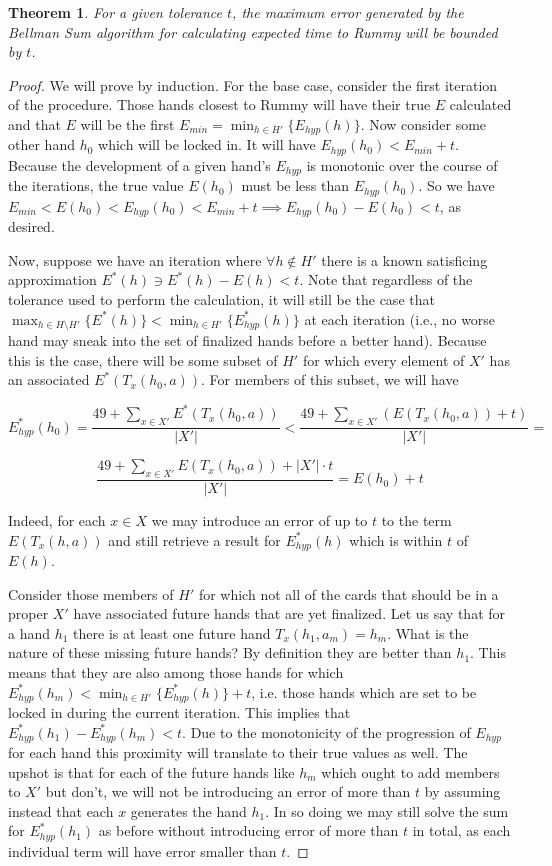 \documentclass[paper=a4, fontsize=11pt,twoside]{report}   %
\newtheorem{theorem}{Theorem}
\begin{document}
\begin{theorem}
For a given tolerance $t$, the maximum error generated by the Bellman Sum algorithm for calculating expected time to Rummy will be bounded by $t$.
\end{theorem}

\begin{proof}
We will prove by induction. For the base case, consider the first iteration of the procedure. Those hands closest to Rummy will have their true $E$ calculated and that $E$ will be the first $E_{min} = \min_{h \in H'} \{E_{hyp}(h)\}$. Now consider some other hand $h_0$ which will be locked in. It will have $E_{hyp}(h_0) < E_{min} + t$. Because the development of a given hand's $E_{hyp}$ is monotonic over the course of the iterations, the true value $E(h_0)$ must be less than $E_{hyp}(h_0)$. So we have $E_{min} < E(h_0) < E_{hyp}(h_0) < E_{min} + t \implies E_{hyp}(h_0) - E(h_0) < t$, as desired.

Now, suppose we have an iteration where $\forall h \notin H'$ there is a known satisficing approximation $E^*(h) \ni E^*(h) - E(h) < t$. Note that regardless of the tolerance used to perform the calculation, it will still be the case that $\max_{h \in H\setminus H'}\{E^*(h)\} < \min_{h \in H'}\{E_{hyp}^*(h)\}$ at each iteration (i.e., no worse hand may sneak into the set of finalized hands before a better hand). Because this is the case, there will be some subset of $H'$ for which every element of $X'$ has an associated $E^*(T_x(h_0,a))$. For members of this subset, we will have

$$E_{hyp}^*(h_0) = \frac{49+\sum_{x\in X'} E^*(T_x(h_0,a))}{|X'|} <  \frac{49+\sum_{x\in X'} (E(T_x(h_0,a))+t)}{|X'|} = $$

$$\frac{49+\sum_{x\in X'} E(T_x(h_0,a))+|X'| \cdot t}{|X'|} = E(h_0) + t$$

Indeed, for each $x \in X$ we may introduce an error of up to $t$ to the term $E(T_x(h,a))$ and still retrieve a result for $E_{hyp}^*(h)$ which is within $t$ of $E(h)$.

Consider those members of $H'$ for which not all of the cards that should be in a proper $X'$ have associated future hands that are yet finalized. Let us say that for a hand $h_1$ there is at least one future hand $T_x(h_1,a_m) = h_m$. What is the nature of these missing future hands? By definition they are better than $h_1$. This means that they are also among those hands for which $E_{hyp}^*(h_m) < \min_{h \in H'}\{E_{hyp}^*(h)\}+t$, i.e. those hands which are set to be locked in during the current iteration. This implies that $E_{hyp}^*(h_1)-E_{hyp}^*(h_m) < t$. Due to the monotonicity of the progression of $E_{hyp}$ for each hand this proximity will translate to their true values as well. The upshot is that for each of the future hands like $h_m$ which ought to add members to $X'$ but don't, we will not be introducing an error of more than $t$ by assuming instead that each $x$ generates the hand $h_1$. In so doing we may still solve the sum for $E_{hyp}^*(h_1)$ as before without introducing error of more than $t$ in total, as each individual term will have error smaller than $t$.


\end{proof}
\end{document}
